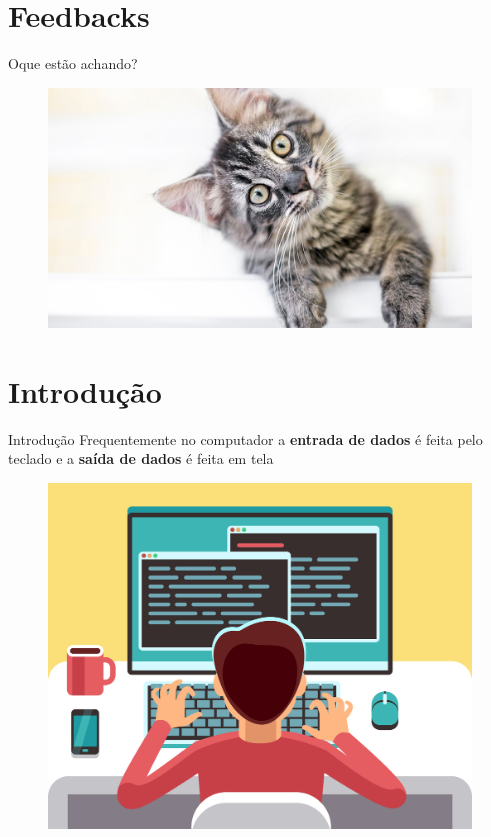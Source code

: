 \section{Feedbacks}
\begin{frame}{Oque estão achando?}
    \begin{figure}
        \centering
        \includegraphics[width=1\linewidth]{figuras/curious.jpg}
    \end{figure}
\end{frame}

\section{Introdução}


\begin{frame}{Introdução}
Frequentemente no computador a \textbf{entrada de dados} é  feita pelo teclado e a \textbf{saída de dados} é feita em tela

\begin{figure}
    \centering
    \includegraphics[width=0.7\linewidth]{figuras/ilust.png}
\end{figure}
\end{frame}




